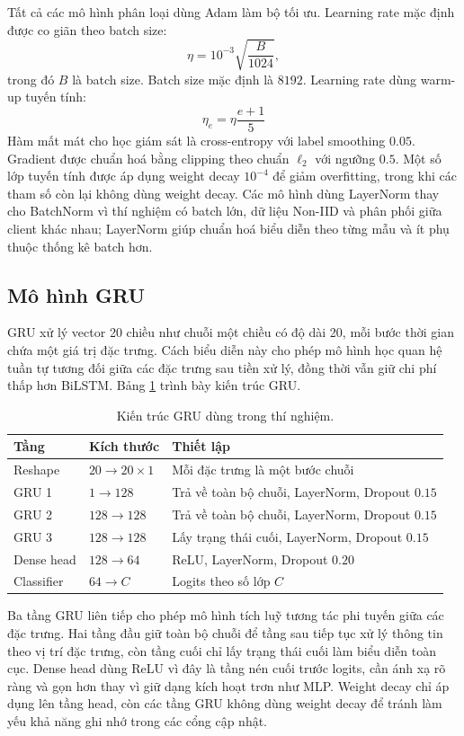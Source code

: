 Tất cả các mô hình phân loại dùng Adam làm bộ tối ưu. Learning rate mặc định được co giãn theo batch size:
\[
\eta=10^{-3}\sqrt{\frac{B}{1024}},
\]
trong đó $B$ là batch size. Batch size mặc định là $8192$. Learning rate dùng warm-up tuyến tính:
\[
\eta_e= \eta\frac{e+1}{5}
\]
Hàm mất mát cho học giám sát là cross-entropy với label smoothing $0.05$. Gradient được chuẩn hoá bằng clipping theo chuẩn $\ell_2$ với ngưỡng $0.5$. Một số lớp tuyến tính được áp dụng weight decay $10^{-4}$ để giảm overfitting, trong khi các tham số còn lại không dùng weight decay. Các mô hình dùng LayerNorm thay cho BatchNorm vì thí nghiệm có batch lớn, dữ liệu Non-IID và phân phối giữa client khác nhau; LayerNorm giúp chuẩn hoá biểu diễn theo từng mẫu và ít phụ thuộc thống kê batch hơn.

\subsection{Mô hình GRU}
\label{sec:gru_arch}

GRU \cite{kasongo2023gru} xử lý vector 20 chiều như chuỗi một chiều có độ dài 20, mỗi bước thời gian chứa một giá trị đặc trưng. Cách biểu diễn này cho phép mô hình học quan hệ tuần tự tương đối giữa các đặc trưng sau tiền xử lý, đồng thời vẫn giữ chi phí thấp hơn BiLSTM. Bảng \ref{tab:gru_arch} trình bày kiến trúc GRU.

\begin{table}[H]
\centering
\caption{Kiến trúc GRU dùng trong thí nghiệm.}
\label{tab:gru_arch}
\begin{tabular}{lll}
\hline
Tầng & Kích thước & Thiết lập \\
\hline
Reshape & $20\rightarrow20\times1$ & Mỗi đặc trưng là một bước chuỗi \\
GRU 1 & $1\rightarrow128$ & Trả về toàn bộ chuỗi, LayerNorm, Dropout $0.15$ \\
GRU 2 & $128\rightarrow128$ & Trả về toàn bộ chuỗi, LayerNorm, Dropout $0.15$ \\
GRU 3 & $128\rightarrow128$ & Lấy trạng thái cuối, LayerNorm, Dropout $0.15$ \\
Dense head & $128\rightarrow64$ & ReLU, LayerNorm, Dropout $0.20$ \\
Classifier & $64\rightarrow C$ & Logits theo số lớp $C$ \\
\hline
\end{tabular}
\end{table}

Ba tầng GRU liên tiếp cho phép mô hình tích luỹ tương tác phi tuyến giữa các đặc trưng. Hai tầng đầu giữ toàn bộ chuỗi để tầng sau tiếp tục xử lý thông tin theo vị trí đặc trưng, còn tầng cuối chỉ lấy trạng thái cuối làm biểu diễn toàn cục. Dense head dùng ReLU vì đây là tầng nén cuối trước logits, cần ánh xạ rõ ràng và gọn hơn thay vì giữ dạng kích hoạt trơn như MLP. Weight decay chỉ áp dụng lên tầng head, còn các tầng GRU không dùng weight decay để tránh làm yếu khả năng ghi nhớ trong các cổng cập nhật.

